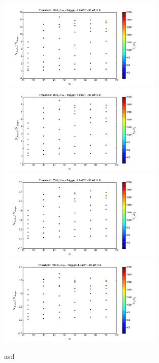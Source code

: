 	\begin{figure}[h!]
		\begin{center}
			\includegraphics[width=0.7\textwidth]{fig/resultadosRadio/CompRadioAuger_10_0_4_0_0_9_hc_modo1.pdf}
			\includegraphics[width=0.7\textwidth]{fig/resultadosRadio/CompRadioAuger_25_0_4_0_0_9_hc_modo1.pdf}
			\includegraphics[width=0.7\textwidth]{fig/resultadosRadio/CompRadioAuger_75_0_4_0_0_9_hc_modo1.pdf}
			\includegraphics[width=0.7\textwidth]{fig/resultadosRadio/CompRadioAuger_100_0_4_0_0_9_hc_modo1.pdf}
			\caption{asd}
			\label{fig:}
		\end{center}
	\end{figure}
	
